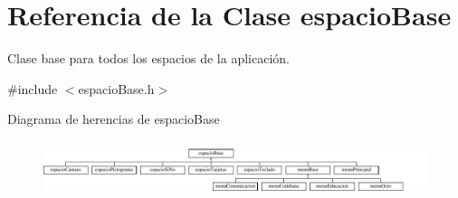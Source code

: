 \hypertarget{classespacio_base}{}\section{Referencia de la Clase espacio\+Base}
\label{classespacio_base}


Clase base para todos los espacios de la aplicación.  




{\ttfamily \#include $<$espacio\+Base.\+h$>$}

Diagrama de herencias de espacio\+Base\begin{figure}[H]
\begin{center}
\leavevmode
\includegraphics[height=1.615385cm]{classespacio_base}
\end{center}
\end{figure}
